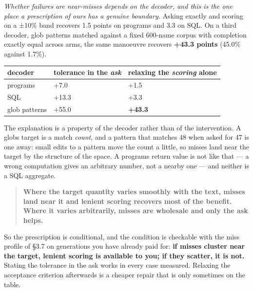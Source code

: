 \documentclass[
  10pt,
]{article}
\theoremstyle{plain}
\theoremstyle{definition}
\begin{document}
\emph{Whether failures are near-misses depends on the decoder, and this
is the one place a prescription of ours has a genuine boundary.} Asking
exactly and scoring on a ±10\% band recovers 1.5 points on programs and
3.3 on SQL. On a third decoder, glob patterns matched against a fixed
600-name corpus with completion exactly equal across arms, the same
manoeuvre recovers \textbf{+43.3 points} (45.0\% against 1.7\%).

{\footnotesize
\begin{longtable}[]{@{}>{\raggedright\arraybackslash}p{}>{\raggedright\arraybackslash}p{}>{\raggedright\arraybackslash}p{}@{}}
\toprule\noalign{}
decoder & tolerance in the \emph{ask} & relaxing the \emph{scoring}
alone \\
\midrule\noalign{}
\endhead
\bottomrule\noalign{}
\endlastfoot
programs & +7.0 & +1.5 \\
SQL & +13.3 & +3.3 \\
glob patterns & +55.0 & \textbf{+43.3} \\
\end{longtable}}

The explanation is a property of the decoder rather than of the
intervention. A glob\textquotesingle s target is a match \emph{count},
and a pattern that matches 48 when asked for 47 is one away: small edits
to a pattern move the count a little, so misses land near the target by
the structure of the space. A program\textquotesingle s return value is
not like that --- a wrong computation gives an arbitrary number, not a
nearby one --- and neither is a SQL aggregate.

\begin{quote}
\textbf{Where the target quantity varies smoothly with the text, misses
land near it and lenient scoring recovers most of the benefit. Where it
varies arbitrarily, misses are wholesale and only the ask helps.}
\end{quote}

So the prescription is conditional, and the condition is checkable with
the miss profile of §3.7 on generations you have already paid for:
\textbf{if misses cluster near the target, lenient scoring is available
to you; if they scatter, it is not.} Stating the tolerance in the ask
works in every case measured. Relaxing the acceptance criterion
afterwards is a cheaper repair that is only sometimes on the table.
\end{document}

